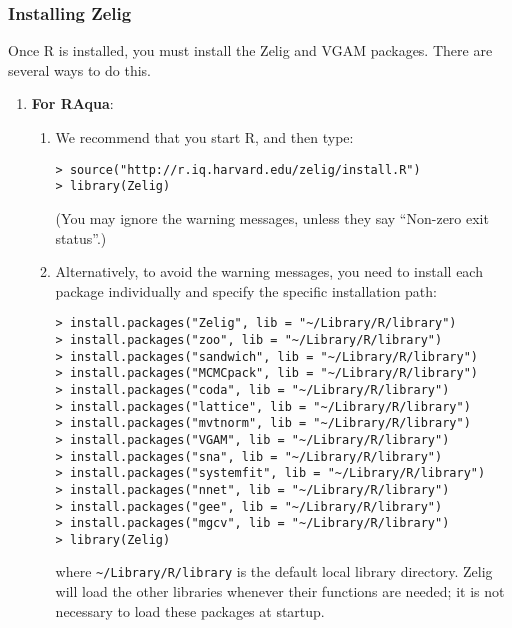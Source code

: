 \subsubsection{Installing Zelig}\label{osx.manual}

Once R is installed, you must install the Zelig and VGAM packages.
There are several ways to do this.
\begin{enumerate}
\item {\bf For RAqua}:
  \begin{enumerate}
    
  \item We recommend that you start R, and then type:
\begin{verbatim}
> source("http://r.iq.harvard.edu/zelig/install.R")
> library(Zelig)
\end{verbatim}
(You may ignore the warning messages, unless they say ``Non-zero exit 
status''.)
\item Alternatively, to avoid the warning messages, you need to install 
each package individually and specify the specific installation path:
\begin{verbatim}
> install.packages("Zelig", lib = "~/Library/R/library")
> install.packages("zoo", lib = "~/Library/R/library")
> install.packages("sandwich", lib = "~/Library/R/library")
> install.packages("MCMCpack", lib = "~/Library/R/library")
> install.packages("coda", lib = "~/Library/R/library")
> install.packages("lattice", lib = "~/Library/R/library")
> install.packages("mvtnorm", lib = "~/Library/R/library")
> install.packages("VGAM", lib = "~/Library/R/library")
> install.packages("sna", lib = "~/Library/R/library")
> install.packages("systemfit", lib = "~/Library/R/library")
> install.packages("nnet", lib = "~/Library/R/library")
> install.packages("gee", lib = "~/Library/R/library")
> install.packages("mgcv", lib = "~/Library/R/library")
> library(Zelig)
\end{verbatim}
    where \texttt{\~{}/Library/R/library} is the default local library
    directory. Zelig will load the other libraries whenever their functions
    are needed; it is not necessary to load these packages at startup.
    

\end{enumerate}
\end{enumerate}
